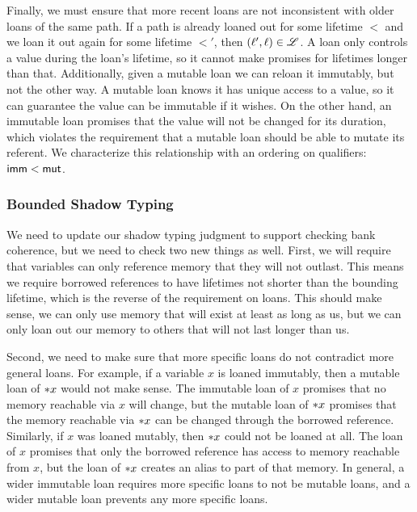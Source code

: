 Finally, we must ensure that more recent loans are not inconsistent with older loans
of the same path. If a path is already loaned out for some lifetime $\lt$ and
we loan it out again for some lifetime $\lt'$, then $(\ell', \ell) \in \mathscr{L}$.
A loan only controls a value during the loan's lifetime, so it cannot make promises
for lifetimes longer than that. Additionally, given a mutable loan we can reloan it immutably,
but not the other way. A mutable loan knows it has unique access to a value, so it can
guarantee the value can be immutable if it wishes. On the other hand, an immutable loan
promises that the value will not be changed for its duration, which violates the requirement
that a mutable loan should be able to mutate its referent. We characterize this relationship
with an ordering on qualifiers: $\mathsf{imm} < \mathsf{mut}$.
\newline

\fbox{$\bankwf{\ltr}{\$}{\lt}$}


\subsubsection*{Bounded Shadow Typing}
We need to update our shadow typing judgment to support checking bank coherence,
but we need to check two new things as well. First, we will require that
variables can only reference memory that they will not outlast. This means
we require borrowed references to have lifetimes not shorter than the bounding lifetime,
which is the reverse of the requirement on loans. This should make sense, we can only use
memory that will exist at least as long as us, but we can only loan out our memory
to others that will not last longer than us.

Second, we need to make sure that more specific loans do not contradict more general loans.
For example, if a variable $x$ is loaned immutably, then a mutable loan of $*{x}$
would not make sense. The immutable loan of $x$ promises that no memory reachable via $x$
will change, but the mutable loan of $*{x}$ promises that the memory reachable 
via $*{x}$ can be changed through the borrowed reference. Similarly, if $x$ was loaned
mutably, then $*{x}$ could not be loaned at all. The loan of $x$ promises that only
the borrowed reference has access to memory reachable from $x$, but the loan of $*{x}$
creates an alias to part of that memory. In general, a wider immutable loan requires more
specific loans to not be mutable loans, and a wider mutable loan prevents any more specific
loans.

